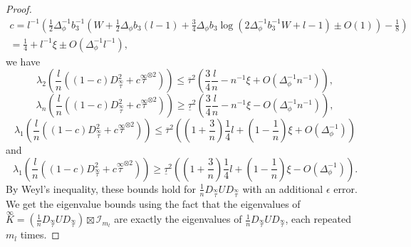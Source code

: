 \documentclass[twoside,11pt]{article}
\newcommand{\Id}{\mathcal{I}}
\newcommand{\limiting}[1]{\overset{\scriptscriptstyle\infty}{#1}}
\begin{document}
\begin{proof}
\begin{multline*}
c = l^{-1} \left( \frac{1}{2} \Delta_\phi^{-1} b_3^{-1} \left( W + \frac{1}{2} \Delta_\phi b_3 (l-1) + \frac{3}{4} \Delta_\phi b_3 \log\left( 2 \Delta_\phi^{-1} b_3^{-1} W + l - 1 \right) \pm O(1) \right) - \frac{1}{8} \right) \\
= \frac{1}{4} + l^{-1} \xi \pm O(\Delta_\phi^{-1} l^{-1}),
\end{multline*}
we have
\[
\lambda_2\left( \frac{l}{n} \left( (1-c) D_{\limiting{\tau}}^2 + c \limiting{\tau}^{\otimes 2} \right) \right)
\leq \overline{\tau}^2 \left( \frac{3}{4} \frac{l}{n} - n^{-1} \xi + O(\Delta_\phi^{-1} n^{-1}) \right),
\]
\[
\lambda_n\left( \frac{l}{n} \left( (1-c) D_{\limiting{\tau}}^2 + c \limiting{\tau}^{\otimes 2} \right) \right)
\geq \underline{\tau}^2 \left( \frac{3}{4} \frac{l}{n} - n^{-1} \xi - O(\Delta_\phi^{-1} n^{-1}) \right),
\]
\[
\lambda_1\left( \frac{l}{n} \left( (1-c) D_{\limiting{\tau}}^2 + c \limiting{\tau}^{\otimes 2} \right) \right)
\leq \overline{\tau}^2 \left( \left( 1 + \frac{3}{n} \right) \frac{1}{4} l + \left( 1 - \frac{1}{n} \right) \xi + O(\Delta_\phi^{-1}) \right) 
\]
and
\[
\lambda_1\left( \frac{l}{n} \left( (1-c) D_{\limiting{\tau}}^2 + c \limiting{\tau}^{\otimes 2} \right) \right)
\geq \underline{\tau}^2 \left( \left( 1 + \frac{3}{n} \right) \frac{1}{4} l + \left( 1 - \frac{1}{n} \right) \xi - O(\Delta_\phi^{-1}) \right).
\]
By Weyl's inequality, these bounds hold for $\frac{1}{n} D_{\limiting{\tau}} U D_{\limiting{\tau}}$ with an additional $\epsilon$ error. We get the eigenvalue bounds using the fact that the eigenvalues of $\limiting{K} = \left( \frac{1}{n} D_{\limiting{\tau}} U D_{\limiting{\tau}} \right) \boxtimes \Id_{m_l}$ are exactly the eigenvalues of $\frac{1}{n} D_{\limiting{\tau}} U D_{\limiting{\tau}}$, each repeated $m_l$ times.


\end{proof}
\end{document}
